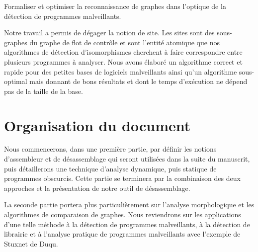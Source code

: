 \begin{pb}
 Formaliser et optimiser la reconnaissance de graphes dans l'optique de la détection de programmes malveillants.
\end{pb}

Notre travail a permis de dégager la notion de site. Les sites sont des sous-graphes du graphe de flot de contrôle et sont l'entité atomique que nos algorithmes de détection d'isomorphismes cherchent à faire correspondre entre plusieurs programmes à analyser. Nous avons élaboré un algorithme correct et rapide pour des petites bases de logiciels malveillants ainsi qu'un algorithme sous-optimal mais donnant de bons résultats et dont le temps d'exécution ne dépend pas de la taille de la base.

\section{Organisation du document}

Nous commencerons, dans une première partie, par définir les notions d'assembleur et de désassemblage qui seront utilisées dans la suite du manuscrit, puis détaillerons une technique d'analyse dynamique, puis statique de programmes obscurcis. Cette partie se terminera par la combinaison des deux approches et la présentation de notre outil de désassemblage.

La seconde partie portera plus particulièrement sur l'analyse morphologique et les algorithmes de comparaison de graphes. Nous reviendrons sur les applications d'une telle méthode à la détection de programmes malveillants, à la détection de librairie et à l'analyse pratique de programmes malveillants avec l'exemple de Stuxnet de Duqu.